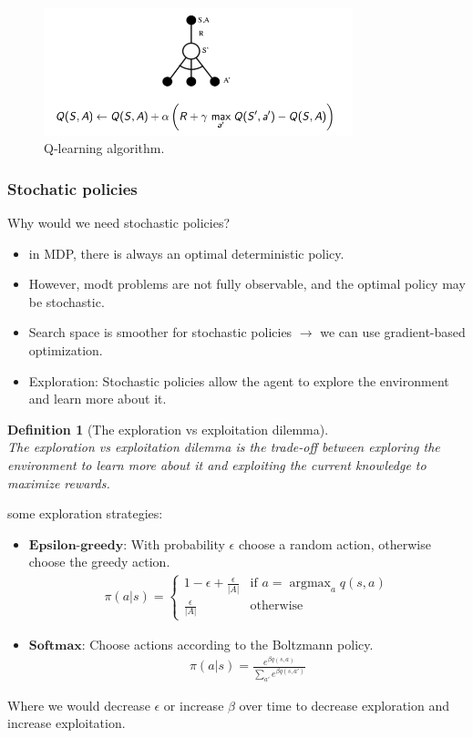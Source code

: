 \documentclass[11pt]{book} %
\DeclareMathOperator*{\argmax}{argmax}
\newtheorem{definition}{Definition}[section]
\begin{document}
\begin{figure}
    \centering
    \includegraphics[width=0.8\textwidth]{./Figs/Q_Learning.png}
    \caption{Q-learning algorithm.}
    \label{fig:Q_learning}
\end{figure}



\subsubsection{Stochatic policies}
Why would we need stochastic policies?
\begin{itemize}
    \item in MDP, there is always an optimal deterministic policy.
    \item However, modt problems are not fully observable, and the optimal policy may be stochastic.
    \item Search space is smoother for stochastic policies $\rightarrow$ we can use gradient-based optimization.
    \item Exploration: Stochastic policies allow the agent to explore the environment and learn more about it.
\end{itemize}

\begin{definition}[The exploration vs exploitation dilemma]\ \\
    The exploration vs exploitation dilemma is the trade-off between exploring the environment to learn more about it and exploiting the current knowledge to maximize rewards.
\end{definition}

some exploration strategies:
\begin{itemize}
    \item $\textbf{Epsilon-greedy}$: With probability $\epsilon$ choose a random action, otherwise choose the greedy action.
    \begin{align*}
        \pi(a|s) = \begin{cases}
            1 - \epsilon + \frac{\epsilon}{|A|} & \text{if } a = \argmax_{a} q(s, a) \\
            \frac{\epsilon}{|A|} & \text{otherwise}
        \end{cases}
    \end{align*}

    \item $\textbf{Softmax}$: Choose actions according to the Boltzmann policy.
    \begin{align*}
        \pi(a|s) = \frac{e^{\beta q(s, a)}}{\sum_{a'} e^{\beta q(s, a')}}
    \end{align*}
\end{itemize}
Where we would decrease $\epsilon$ or increase $\beta$ over time to decrease exploration and increase exploitation.
\end{document}
